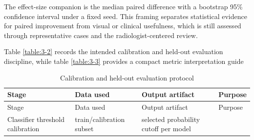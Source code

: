 The effect-size companion is the median paired
difference with a bootstrap 95\% confidence interval under a fixed seed.
This framing separates statistical evidence for paired improvement from
visual or clinical usefulness, which is still assessed through
representative cases and the radiologist-centered review.

Table \ref{table:3-2} records the intended calibration and held-out evaluation
discipline, while table \ref{table:3-3} provides a compact metric interpretation guide

\begin{longtable}[]{@{}llll@{}}
	\caption{Calibration and held-out evaluation protocol}\tabularnewline
	\toprule
	\begin{minipage}[b]{0.17\columnwidth}\raggedright
		Stage\strut
	\end{minipage} & \begin{minipage}[b]{0.17\columnwidth}\raggedright
		Data used\strut
	\end{minipage} & \begin{minipage}[b]{0.17\columnwidth}\raggedright
		Output artifact\strut
	\end{minipage} & \begin{minipage}[b]{0.17\columnwidth}\raggedright
		Purpose\strut
	\end{minipage} \tabularnewline
	\midrule
	\endfirsthead
	\toprule
	\begin{minipage}[b]{0.17\columnwidth}\raggedright
		Stage\strut
	\end{minipage} & \begin{minipage}[b]{0.17\columnwidth}\raggedright
		Data used\strut
	\end{minipage} & \begin{minipage}[b]{0.17\columnwidth}\raggedright
		Output artifact\strut
	\end{minipage} & \begin{minipage}[b]{0.17\columnwidth}\raggedright
		Purpose\strut
	\end{minipage} \tabularnewline
	\midrule
	\endhead
	\begin{minipage}[t]{0.17\columnwidth}\raggedright
		Classifier threshold calibration\strut
	\end{minipage} & \begin{minipage}[t]{0.17\columnwidth}\raggedright
		train/calibration subset\strut
	\end{minipage} & \begin{minipage}[t]{0.17\columnwidth}\raggedright
		selected probability cutoff per model\strut

\end{minipage}
\end{longtable}
